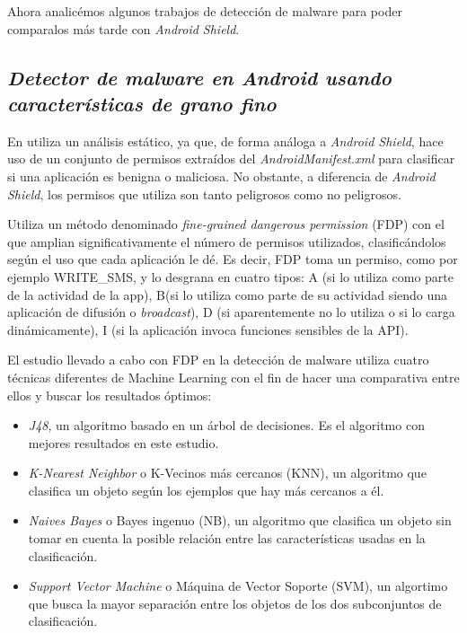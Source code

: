 Ahora analicémos algunos trabajos de detección de malware para poder comparalos más tarde con \textit{Android Shield}.

\subsection{\textit{Detector de malware en Android usando características de grano fino}}

En\hypersetup{citecolor=red}\cite{jiang} utiliza un análisis estático, ya que, de forma análoga a \textit{Android Shield}, hace uso de un conjunto de permisos extraídos del \textit{AndroidManifest.xml} para clasificar si una aplicación es benigna o maliciosa. No obstante, a diferencia de \textit{Android Shield}, los permisos que utiliza son tanto peligrosos como no peligrosos.

Utiliza un método denominado \textit{fine-grained dangerous permission} (FDP) con el que amplian significativamente el número de permisos utilizados, clasificándolos según el uso que cada aplicación le dé. Es decir, FDP toma un permiso, como por ejemplo \textsc{WRITE\_SMS}, y lo desgrana en cuatro tipos: A (si lo utiliza como parte de la actividad de la app), B(si lo utiliza como parte de su actividad siendo una aplicación de difusión o \textit{broadcast}), D (si aparentemente no lo utiliza o si lo carga dinámicamente), I (si la aplicación invoca funciones sensibles de la API).

El estudio llevado a cabo con FDP en la detección de malware utiliza cuatro técnicas diferentes de Machine Learning con el fin de hacer una comparativa entre ellos y buscar los resultados óptimos:

\begin{itemize}
	\item \textit{J48}, un algoritmo basado en un árbol de decisiones. Es el algoritmo con mejores resultados en este estudio.
	\item \textit{K-Nearest Neighbor} o K-Vecinos más cercanos (KNN), un algoritmo que clasifica un objeto según los ejemplos que hay más cercanos a él.
	\item \textit{Naives Bayes} o Bayes ingenuo (NB), un algoritmo que clasifica un objeto sin tomar en cuenta la posible relación entre las características usadas en la clasificación.
	\item \textit{Support Vector Machine} o Máquina de Vector Soporte (SVM), un algortimo que busca la mayor separación entre los objetos de los dos subconjuntos de clasificación.
\end{itemize}

